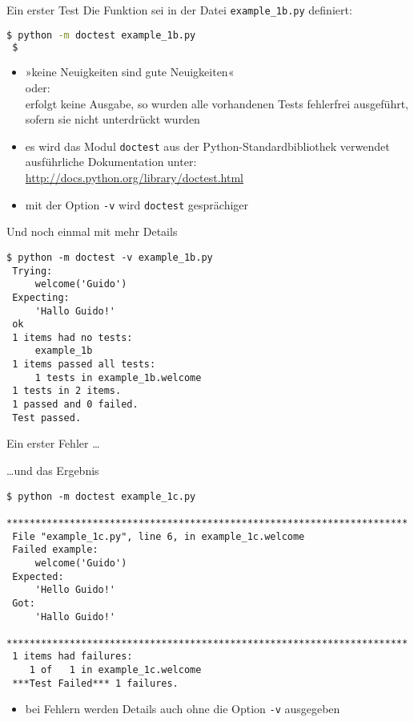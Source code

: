 \documentclass[t, utf8x, 10pt]{beamer}
\begin{document}
\begin{frame}[fragile]{Ein erster Test}
 Die Funktion sei in der Datei \texttt{example\_1b.py} definiert:

 \begin{lstlisting}[language=bash]
 $ python -m doctest example_1b.py
 $ 
 \end{lstlisting}

 \begin{itemize}
  \item »keine Neuigkeiten sind gute Neuigkeiten«\\
	oder:\\
	erfolgt keine Ausgabe, so wurden alle vorhandenen Tests fehlerfrei
	ausgeführt, sofern sie nicht unterdrückt wurden
  \item es wird das Modul \texttt{doctest} aus der Python-Standardbibliothek
	verwendet\\
	ausführliche Dokumentation unter:
	\url{http://docs.python.org/library/doctest.html}
  \item mit der Option \texttt{-v} wird \texttt{doctest} gesprächiger
 \end{itemize}
\end{frame}


\begin{frame}[fragile]{Und noch einmal mit mehr Details}
	\begin{lstlisting}[language={}]
 $ python -m doctest -v example_1b.py
 Trying:
     welcome('Guido')
 Expecting:
     'Hallo Guido!'
 ok
 1 items had no tests:
     example_1b
 1 items passed all tests:
     1 tests in example_1b.welcome
 1 tests in 2 items.
 1 passed and 0 failed.
 Test passed.
 \end{lstlisting}
\end{frame}


\begin{frame}[fragile]{Ein erster Fehler \dots}
 
\end{frame}


\begin{frame}[fragile]{\dots und das Ergebnis}
 \begin{lstlisting}[language={}]
 $ python -m doctest example_1c.py
 **********************************************************************
 File "example_1c.py", line 6, in example_1c.welcome
 Failed example:
     welcome('Guido')
 Expected:
     'Hello Guido!'
 Got:
     'Hallo Guido!'
 **********************************************************************
 1 items had failures:
    1 of   1 in example_1c.welcome
 ***Test Failed*** 1 failures.
 \end{lstlisting}

 \begin{itemize}
  \item bei Fehlern werden Details auch ohne die Option \texttt{-v} ausgegeben
 \end{itemize}
\end{frame}
\end{document}

